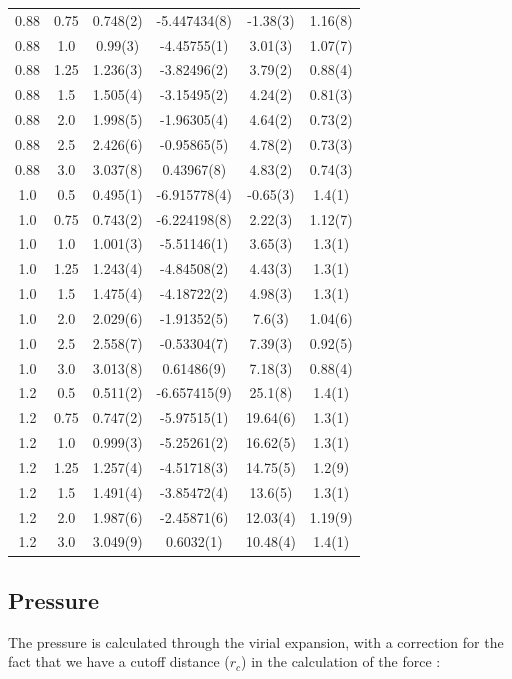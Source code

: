 \documentclass[aps,prl,reprint,groupedaddress]{revtex4-1}
\begin{document}
\begin{table}[ht]
\begin{ruledtabular}
\begin{tabular}{ c  c  c  c  c  c }
0.88 & 0.75 & 0.748(2) & -5.447434(8) & -1.38(3) & 1.16(8) \\ 
0.88 & 1.0 & 0.99(3) & -4.45755(1) & 3.01(3) & 1.07(7) \\ 
0.88 & 1.25 & 1.236(3) & -3.82496(2) & 3.79(2) & 0.88(4) \\ 
0.88 & 1.5 & 1.505(4) & -3.15495(2) & 4.24(2) & 0.81(3) \\ 
0.88 & 2.0 & 1.998(5) & -1.96305(4) & 4.64(2) & 0.73(2) \\ 
0.88 & 2.5 & 2.426(6) & -0.95865(5) & 4.78(2) & 0.73(3) \\ 
0.88 & 3.0 & 3.037(8) & 0.43967(8) & 4.83(2) & 0.74(3) \\ 
1.0 & 0.5 & 0.495(1) & -6.915778(4) & -0.65(3) & 1.4(1) \\ 
1.0 & 0.75 & 0.743(2) & -6.224198(8) & 2.22(3) & 1.12(7) \\ 
1.0 & 1.0 & 1.001(3) & -5.51146(1) & 3.65(3) & 1.3(1) \\ 
1.0 & 1.25 & 1.243(4) & -4.84508(2) & 4.43(3) & 1.3(1) \\ 
1.0 & 1.5 & 1.475(4) & -4.18722(2) & 4.98(3) & 1.3(1) \\ 
1.0 & 2.0 & 2.029(6) & -1.91352(5) & 7.6(3) & 1.04(6) \\ 
1.0 & 2.5 & 2.558(7) & -0.53304(7) & 7.39(3) & 0.92(5) \\ 
1.0 & 3.0 & 3.013(8) & 0.61486(9) & 7.18(3) & 0.88(4) \\ 
1.2 & 0.5 & 0.511(2) & -6.657415(9) & 25.1(8) & 1.4(1) \\ 
1.2 & 0.75 & 0.747(2) & -5.97515(1) & 19.64(6) & 1.3(1) \\ 
1.2 & 1.0 & 0.999(3) & -5.25261(2) & 16.62(5) & 1.3(1) \\ 
1.2 & 1.25 & 1.257(4) & -4.51718(3) & 14.75(5) & 1.2(9) \\ 
1.2 & 1.5 & 1.491(4) & -3.85472(4) & 13.6(5) & 1.3(1) \\ 
1.2 & 2.0 & 1.987(6) & -2.45871(6) & 12.03(4) & 1.19(9) \\ 
1.2 & 3.0 & 3.049(9) & 0.6032(1) & 10.48(4) & 1.4(1) 
\end{tabular}
\end{ruledtabular}
\end{table}
\endgroup

\subsection{Pressure}

The pressure is calculated through the virial expansion, with a correction for the fact that we have a cutoff distance ($r_c$) in the calculation of the force \cite{ICCPBook}:
\end{document}
